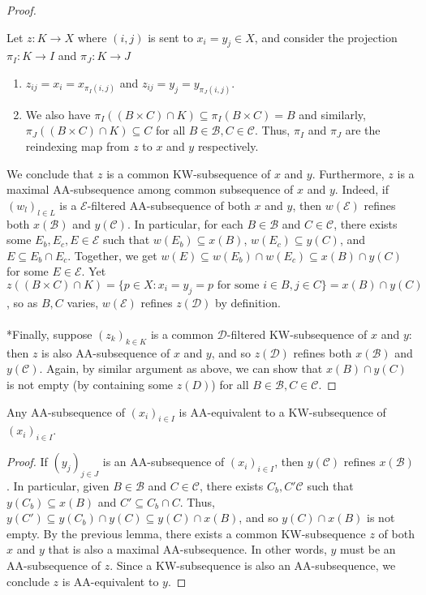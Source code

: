 \documentclass{treatise}
\begin{document}
\begin{proof}
\begin{enumerate}
\end{enumerate}
Let $z: K \to X$ where $(i, j)$ is sent to $x_i = y_j \in X$, and consider the projection $\pi_I : K \to I$ and $\pi_J : K \to J$
\begin{enumerate}
    \item $z_{ij} = x_i = x_{\pi_I(i, j)}$ and $z_{ij} = y_j = y_{\pi_J(i, j)}$.
    \item We also have $\pi_I ((B \times C) \cap K) \subseteq \pi_I(B \times C) = B$ and similarly, $\pi_J((B \times C) \cap K) \subseteq C$ for all $B \in \mathcal{B}, C \in \mathcal{C}$. Thus, $\pi_I$ and $\pi_J$ are the reindexing map from $z$ to $x$ and $y$ respectively.
\end{enumerate}
We conclude that $z$ is a common KW-subsequence of $x$ and $y$. Furthermore, $z$ is a maximal AA-subsequence among common subsequence of $x$ and $y$. Indeed, if $(w_l)_{l \in L}$ is a $\mathcal{E}$-filtered AA-subsequence of both $x$ and $y$, then $w(\mathcal{E})$ refines both $x(\mathcal{B})$ and $y(\mathcal{C})$. In particular, for each $B \in \mathcal{B}$ and $C \in \mathcal{C}$, there exists some $E_b, E_c, E \in \mathcal{E}$ such that $w(E_b) \subseteq x(B)$, $w(E_c) \subseteq y(C)$, and $E \subseteq E_b \cap E_c$. Together, we get $w(E) \subseteq w(E_b) \cap w(E_c) \subseteq x(B) \cap y(C)$ for some $E \in \mathcal{E}$. Yet $z((B \times C) \cap K) = \{ p \in X : x_i = y_j = p \mbox{ for some } i \in B, j \in C \} = x(B) \cap y(C)$, so as $B, C$ varies, $w(\mathcal{E})$ refines $z(\mathcal{D})$ by definition.
\\
\\
*Finally, suppose $(z_k)_{k \in K}$ is a common $\mathcal{D}$-filtered KW-subsequence of $x$ and $y$: then $z$ is also AA-subsequence of $x$ and $y$, and so $z(\mathcal{D})$ refines both $x(\mathcal{B})$ and $y(\mathcal{C})$. Again, by similar argument as above, we can show that $x(B) \cap y(C)$ is not empty (by containing some $z(D)$) for all $B \in \mathcal{B}, C \in \mathcal{C}$.
\end{proof}
\begin{theorem}
Any AA-subsequence of $(x_i)_{i \in I}$ is AA-equivalent to a KW-subsequence of $(x_i)_{i \in I}$.
\end{theorem}
\begin{proof}
If $(y_j)_{j \in J}$ is an AA-subsequence of $(x_i)_{i \in I}$, then $y(\mathcal{C})$ refines $x(\mathcal{B})$. In particular, given $B \in \mathcal{B}$ and $C \in \mathcal{C}$, there exists $C_b, C' \mathcal{C}$ such that $y(C_b) \subseteq x(B)$ and $C' \subseteq C_b \cap C$. Thus, $y(C') \subseteq y(C_b) \cap y(C) \subseteq y(C) \cap x(B)$, and so $y(C) \cap x(B)$ is not empty. By the previous lemma, there exists a common KW-subsequence $z$ of both $x$ and $y$ that is also a maximal AA-subsequence. In other words, $y$ must be an AA-subsequence of $z$. Since a KW-subsequence is also an AA-subsequence, we conclude $z$ is AA-equivalent to $y$.
\end{proof}
\end{document}
